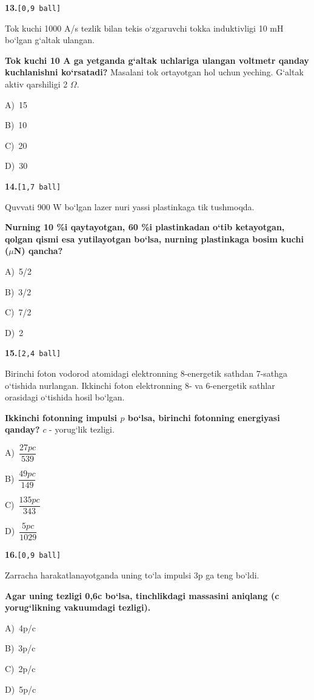 \documentclass[11pt,a4paper]{article}
\newcommand{\ball}[1]{\hfill\texttt{[#1 ball]}}
\newcommand{\qhead}[2]{\Needspace{10\baselineskip}\noindent\textbf{#1.}\ball{#2}\par\nopagebreak}
\newcommand{\opt}[2]{\hspace*{8mm}#1)\ #2\par}
\newenvironment{qbody}{\begin{list}{}{\leftmargin=8mm\rightmargin=0pt\topsep=0pt\itemsep=0pt\parsep=3pt}\item\relax}{\end{list}}
\begin{document}
\noindent\begin{minipage}{\linewidth}
\qhead{13}{0,9}
\begin{qbody}
Tok kuchi 1000 A/s tezlik bilan tekis o‘zgaruvchi tokka induktivligi 10 mH bo‘lgan g‘altak ulangan.\par
\textbf{Tok kuchi 10 A ga yetganda g‘altak uchlariga ulangan voltmetr qanday kuchlanishni ko‘rsatadi?} Masalani tok ortayotgan hol uchun yeching. G‘altak aktiv qarshiligi 2 $\Omega$.\par
\smallskip
\opt{A}{15}
\opt{B}{10}
\opt{C}{20}
\opt{D}{30}
\end{qbody}\end{minipage}\par\vspace{16pt}
\noindent\begin{minipage}{\linewidth}
\qhead{14}{1,7}
\begin{qbody}
Quvvati 900 W bo‘lgan lazer nuri yassi plastinkaga tik tushmoqda.\par
\textbf{Nurning 10 \%i qaytayotgan, 60 \%i plastinkadan o‘tib ketayotgan, qolgan qismi esa yutilayotgan bo‘lsa, nurning plastinkaga bosim kuchi ($\mu$N) qancha?}\par
\smallskip
\opt{A}{5/2}
\opt{B}{3/2}
\opt{C}{7/2}
\opt{D}{2}
\end{qbody}\end{minipage}\par\vspace{16pt}
\noindent\begin{minipage}{\linewidth}
\qhead{15}{2,4}
\begin{qbody}
Birinchi foton vodorod atomidagi elektronning 8-energetik sathdan 7-sathga o‘tishida nurlangan. Ikkinchi foton elektronning 8- va 6-energetik sathlar orasidagi o‘tishida hosil bo‘lgan.\par
\textbf{Ikkinchi fotonning impulsi $p$ bo‘lsa, birinchi fotonning energiyasi qanday?} $c$ - yorug‘lik tezligi.\par
\smallskip
\opt{A}{$\dfrac{27pc}{539}$}
\opt{B}{$\dfrac{49pc}{149}$}
\opt{C}{$\dfrac{135pc}{343}$}
\opt{D}{$\dfrac{5pc}{1029}$}
\end{qbody}\end{minipage}\par\vspace{16pt}
\noindent\begin{minipage}{\linewidth}
\qhead{16}{0,9}
\begin{qbody}
Zarracha harakatlanayotganda uning to‘la impulsi 3p ga teng bo‘ldi.\par
\textbf{Agar uning tezligi 0,6c bo‘lsa, tinchlikdagi massasini aniqlang (c yorug‘likning vakuumdagi tezligi).}\par
\smallskip
\opt{A}{4p/c}
\opt{B}{3p/c}
\opt{C}{2p/c}
\opt{D}{5p/c}
\end{qbody}\end{minipage}\par\vspace{16pt}
\end{document}
